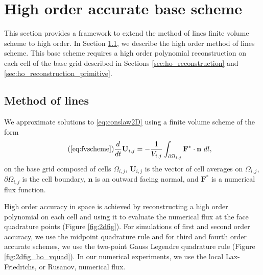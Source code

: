 \appendix
\section{High order accurate base scheme}\label{sec:ho}
This section provides a framework to extend the method of lines finite volume scheme to high order.  
In Section \ref{sec:ho_basescheme}, we describe the high order method of lines scheme.  This base scheme requires a high order polynomial reconstruction on each cell of the base grid described in Sections \ref{sec:ho_reconstruction} and \ref{sec:ho_reconstruction_primitive}.


\subsection{Method of lines} \label{sec:ho_basescheme}

We approximate solutions to \eqref{eq:conslaw2D} using a finite volume scheme of the form
\begin{equation}\tag{\ref{eq:fvscheme}} 
\frac{d}{dt}\mathbf{U}_{i,j} =- \frac{1}{V_{i,j}} \int_{\partial \Omega_{i,j}} \mathbf{F}^* \cdot \mathbf{n} ~dl,
\end{equation}
on the base grid composed of cells $\Omega_{i,j}$, $\mathbf{U}_{i,j}$ is the vector of cell averages on $\Omega_{i,j}$, $\partial \Omega_{i,j}$ is the cell boundary, $\mathbf{n}$ is an outward facing normal, and $\mathbf{F}^*$ is a numerical flux function.

High order accuracy in space is achieved by reconstructing a high order polynomial on each cell and using it to evaluate the numerical flux at the face quadrature points (Figure \ref{fig:2dfig}).  For simulations of first and second order accuracy, we use the midpoint quadrature rule and for third and fourth order accurate schemes, we use the two-point Gauss Legendre quadrature rule (Figure \ref{fig:2dfig_ho_vquad}).  In our numerical experiments, we use the local Lax-Friedrichs, or Rusanov, numerical flux.

